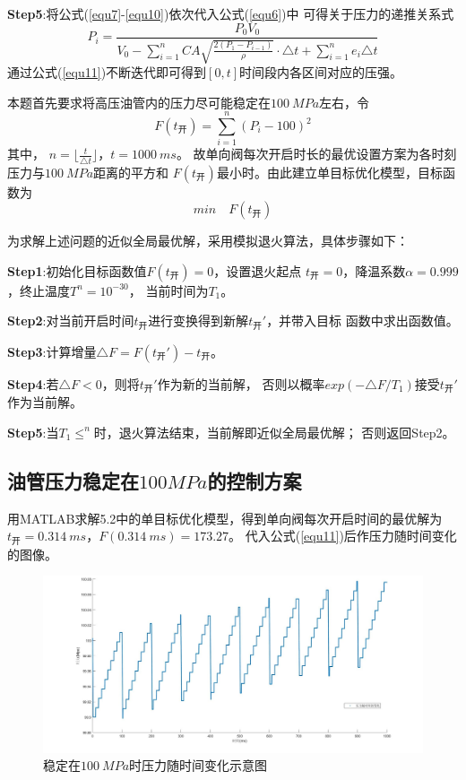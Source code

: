 \documentclass[withoutpreface,bwprint]{cumcmthesis} %
\begin{document}
    \textbf{Step5}:将公式(\ref{equ7}-\ref{equ10})依次代入公式(\ref{equ6})中
    可得关于压力的递推关系式
    \begin{equation}
        P_i=\frac{P_0V_0}
        {V_0-\sum\limits_{i=1}^n CA\sqrt{\frac{2(P_1-P_{i-1})}{\rho}}\cdot\triangle t +\sum\limits_{i=1}^n e_i\triangle t}
    \label{equ11}
    \end{equation}
    通过公式(\ref{equ11})不断迭代即可得到$[0,t]$时间段内各区间对应的压强。

    本题首先要求将高压油管内的压力尽可能稳定在$100~MPa$左右，令
    \begin{equation}
        F(t_{\text{开}})=\sum\limits_{i=1}^n (P_i-100)^2
    \label{equ12}
    \end{equation}
    其中，
    $n=\lfloor{\frac{t}{\triangle t}}\rfloor$，$t=1000~ms$。
    故单向阀每次开启时长的最优设置方案为各时刻压力与$100~MPa$距离的平方和
    $F(t_{\text{开}})$最小时。由此建立单目标优化模型，目标函数为
    \begin{equation}
       min \quad F(t_{\text{开}})
    \label{equ13}
    \end{equation}

    为求解上述问题的近似全局最优解，采用模拟退火算法，具体步骤如下：

    \textbf{Step1}:初始化目标函数值$F(t_{\text{开}})=0$，设置退火起点
    $t_{\text{开}}=0$，降温系数$\alpha=0.999$，终止温度$T^n=10^{-30}$，
    当前时间为$T_1$。

    \textbf{Step2}:对当前开启时间$t_{\text{开}}$进行变换得到新解$t_{\text{开}}'$，并带入目标
    函数中求出函数值。

    \textbf{Step3}:计算增量$\triangle F=F(t_{\text{开}}')-t_{\text{开}}$。
    
    \textbf{Step4}:若$\triangle F<0$，则将$t_{\text{开}}'$作为新的当前解，
    否则以概率$exp(-\triangle F/T_1)$接受$t_{\text{开}}'$作为当前解。

    \textbf{Step5}:当$T_1 \leq ^n$时，退火算法结束，当前解即近似全局最优解；
    否则返回Step2。

\subsection{油管压力稳定在$100MPa$的控制方案}
    用MATLAB求解5.2中的单目标优化模型，得到单向阀每次开启时间的最优解为
    $t_{\text{开}}=0.314~ms$，$F(0.314~ms)=173.27$。
    代入公式(\ref{equ11})后作压力随时间变化的图像。 
    \begin{figure}[!h]
    \centering
    \includegraphics[width=.95\textwidth]{100Mpa.jpg}
    \caption{稳定在$100~MPa$时压力随时间变化示意图}
    \label{figure3}
    \end{figure}
\end{document}
